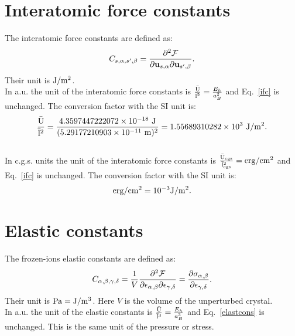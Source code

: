 \documentclass[12pt,a4paper,twoside]{report}
\def\abohr{5.29177210903\times 10^{-11}}
\def\baru{4.3597447222072\times 10^{-18}}
\def\barifc{1.55689310282\times 10^{3}}
\begin{document}
\newpage
{\color{coral}\section{Interatomic force constants}}
\color{black}

The interatomic force constants are defined as:
\begin{equation}
C_{s,\alpha,s',\beta}={\partial^2 \mathcal{F} \over \partial 
{\bf u}_{s,\alpha} \partial {\bf u}_{s',\beta}}.
\label{ifc}
\end{equation}
Their unit is ${\rm J}/{\rm m}^2$.
\\

{\color{web-blue} In a.u. the unit of the interatomic force constants is 
${{\rm \bar U} \over {\rm \bar l}^2}={E_h\over a_B^2}$ and Eq.~\ref{ifc} is 
unchanged.
The conversion factor with the SI unit is:
\begin{equation}
{{\rm \bar U} \over {\rm \bar l}^2}={\baru\ {\rm J} \over (\abohr\ {\rm m})^2}=\barifc\ {\rm J}/{\rm m}^2.
\end{equation}
}
\\

{\color{orange} In c.g.s. units the unit of the interatomic 
force constants is 
${{\rm \bar U_{cgs}} \over {\rm \bar l_{cgs}}^2}={\rm erg}/{\rm cm}^2$ and Eq.~\ref{ifc} is 
unchanged.
The conversion factor with the SI unit is:
\begin{equation}
{\rm erg}/{\rm cm}^2= 10^{-3} {\rm J}/{\rm m}^2.
\end{equation}
}

\newpage
{\color{coral}\section{Elastic constants}}
\color{black}

The frozen-ions elastic constants are defined as:
\begin{equation}
C_{\alpha,\beta,\gamma,\delta}= {1\over V} 
{\partial^2 \mathcal{F} \over \partial 
\epsilon_{\alpha,\beta} \partial \epsilon_{\gamma,\delta}}={\partial
\sigma_{\alpha,\beta}\over \partial \epsilon_{\gamma,\delta}}.
\label{elastcons}
\end{equation}
Their unit is ${\rm Pa}={\rm J}/{\rm m}^3$. Here $V$ is the volume of the 
unperturbed crystal.
\\

{\color{web-blue} In a.u. the unit of the elastic constants is 
${{\rm \bar U} \over {\rm \bar l}^3}={E_h\over a_B^3}$ and 
Eq.~\ref{elastcons} is 
unchanged. This is the same unit of the pressure or stress.
}
\\
\end{document}
